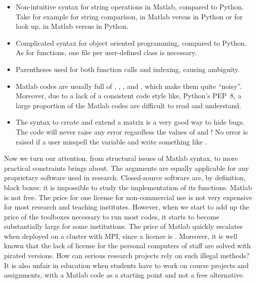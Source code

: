 \begin{itemize}
\item Non-intuitive syntax for string operations in Matlab, compared to
Python. Take for example for string comparison,  in
Matlab versus  in Python or for look up,
 in Matlab versus 
in Python.
\item Complicated syntax for object oriented programming, compared to Python.
As for functions, one file per user-defined class is necessary.
\item Parentheses used for both function calls and indexing, causing ambiguity.
\item Matlab codes are usually full of \codeinline{;}, ,
, \codeinline{\&\&} and \codeinline{||}, which make them quite
``noisy''.  Moreover, due to a lack of a consistent code style like, Python's
PEP~8, a
large proportion of the Matlab codes are difficult to read and understand.
\item The syntax  to create and extend a matrix is a
very good way to hide bugs. The code 
will never raise any error regardless the values of  and
! No error is raised if a user misspell the variable
 and write something like .
\end{itemize}
%
Now we turn our attention, from structural issues of Matlab syntax, to more
practical constraints brings about. The arguments are equally applicable for
any proprietary software used in research.  Closed-source
software are, by definition, black boxes: it is impossible to study the
implementation of its functions.
%
Matlab is not free. The price for one license for non-commercial use is not
very expensive for most research and teaching institutes. However, when we
start to add up the price of the toolboxes necessary to run most codes, it
starts to become substantially large for some institutions.  The price of
Matlab quickly escalates when deployed on a cluster with MPI, since a licence
is .
%
Moreover, it is well known that the lack of license for the personal computers
of staff are solved with pirated versions. How can serious
research projects rely on such illegal methods?
%
It is also unfair in education when students have to work on course projects and
assignments, with a Matlab code as a starting point and not a free alternative.


